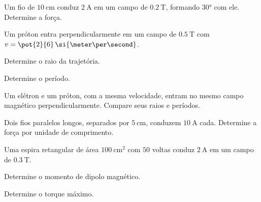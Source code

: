 \blocoaplicacao
\begin{questao}[2]{}

Um fio de $\SI{10}{\centi\meter}$ conduz $\SI{2}{\ampere}$ em um campo de
$\SI{0.2}{\tesla}$, formando $\ang{30}$ com ele. Determine a força.


\end{questao}
\begin{questao}[2]{}

Um próton entra perpendicularmente em um campo de $\SI{0.5}{\tesla}$ com
$v=\pot{2}{6}\,\si{\meter\per\second}$.
\begin{itensq}
\item Determine o raio da trajetória.
\item Determine o período.
\end{itensq}


\end{questao}
\begin{questao}[2]{}

Um elétron e um próton, com a mesma velocidade, entram no mesmo campo
magnético perpendicularmente. Compare seus raios e períodos.


\end{questao}
\begin{questao}[2]{}

Dois fios paralelos longos, separados por $\SI{5}{\centi\meter}$, conduzem
$\SI{10}{\ampere}$ cada. Determine a força por unidade de comprimento.


\end{questao}
\begin{questao}[2]{}

Uma espira retangular de área $\SI{100}{\centi\meter\squared}$ com $50$ voltas
conduz $\SI{2}{\ampere}$ em um campo de $\SI{0.3}{\tesla}$.
\begin{itensq}
\item Determine o momento de dipolo magnético.
\item Determine o torque máximo.
\end{itensq}


\end{questao}

